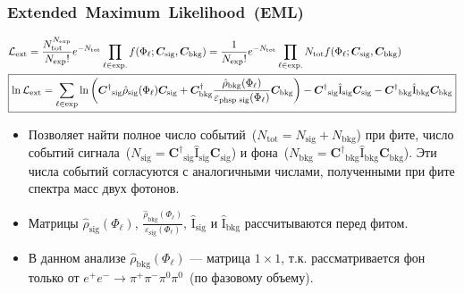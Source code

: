 \documentclass{beamer}
\begin{document}
\begin{frame}
  \frametitle{Extended~Maximum~Likelihood~(EML)}
  \scriptsize
  \begin{eqnarray*}
    \textstyle
    \begin{split}
      &\mathcal{L}_{\text{ext}} = \frac{N^{N_{\text{exp}}}_{\text{tot}}}{N_{\text{exp}}!}e^{-N_{\text{tot}}}\prod_{\ell \in \text{exp.}}f(\Phi_{\ell};\bm{C}_{\text{sig}},\bm{C}_{\text{bkg}}) = \frac{1}{N_{\text{exp}}!}e^{-N_{\text{tot}}}\prod_{\ell \in \text{exp.}}N_{\text{tot}}f(\Phi_{\ell};\bm{C}_{\text{sig}},\bm{C}_{\text{bkg}}) \\
      &\boxed{%
       \ln{\mathcal{L}_{\text{ext}}} = \sum_{\ell \in \text{exp}}\ln{\left(
        {\bm{C}^{\dag}}_{\text{sig}}\hat{\rho}_{\text{sig}}(\Phi_{\ell})\bm{C}_{\text{sig}} +
        \bm{C}^{\dag}_{\text{bkg}}\frac{\hat{\rho}_{\text{bkg}}(\Phi_{\ell})}{\varepsilon_{\text{phsp sig}}(\Phi_{\ell})}\bm{C}_{\text{bkg}} \right)} - {\bm{C}^{\dag}}_{\text{sig}}\hat{\text{I}}_{\text{sig}}\bm{C}_{\text{sig}} - {\bm{C}^{\dag}}_{\text{bkg}}\hat{\text{I}}_{\text{bkg}}\bm{C}_{\text{bkg}}%
        }
    \end{split}
  \end{eqnarray*}
  \begin{itemize}
    \item Позволяет найти полное число событий~($N_{\text{tot}}=N_{\text{sig}} + N_{\text{bkg}}$) при фите, число
      событий
      сигнала~($N_{\text{sig}}={\bm{C}^{\dag}}_{\text{sig}}\hat{\text{I}}_{\text{sig}}\bm{C}_{\text{sig}}$)
      и
      фона~($N_{\text{bkg}}={\bm{C}^{\dag}}_{\text{bkg}}\hat{\text{I}}_{\text{bkg}}\bm{C}_{\text{bkg}}$).
      Эти числа событий согласуются с аналогичными числами, полученными при фите
      спектра масс двух фотонов.
    \item Матрицы $\hat{\rho}_{\text{sig}}(\Phi_{\ell})$,
      $\frac{\hat{\rho}_{\text{bkg}}(\Phi_{\ell})}{\varepsilon_{\text{sig}}(\Phi_{\ell})}$,
      $\hat{\text{I}}_{\text{sig}}$ и $\hat{\text{I}}_{\text{bkg}}$ рассчитываются
      перед фитом.
    \item В данном анализе $\hat{\rho}_{\text{bkg}}(\Phi_{\ell})$ --- матрица $1\times{1}$, т.к.
      рассматривается фон только от $e^+e^-\rightarrow\pi^+\pi^-\pi^0\pi^0$~(по фазовому объему).
    \end{itemize}
  \end{frame}
\end{document}
